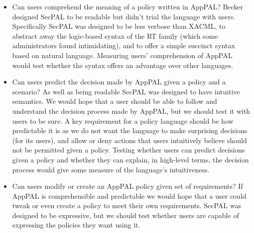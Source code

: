 \documentclass[thesis.tex]{subfiles}
\begin{document}
\begin{itemize}
\item Can users comprehend the meaning of a policy written in AppPAL? Becker
  designed SecPAL to be readable but didn't trial the language with users.
  Specifically SecPAL was designed to be less verbose than XACML, to abstract away
  the logic-based syntax of the RT family (which some administrators found
  intimidating), and to offer a simple succinct syntax based on natural language.
  Measuring users' comprehension of AppPAL would test whether the syntax offers an
  advantage over other languages.

\item Can users predict the decision made by AppPAL given a policy and
a scenario? As well as being readable SecPAL was designed to have
intuitive semantics. We would hope that a user should be able to
follow and understand the decision process made by AppPAL, but we
should test it with users to be sure. A key requirement for a policy
language should be how predictable it is as we do not want the language
to make surprising decisions (for its users), and allow or deny
actions that users intuitively believe should not be permitted given a
policy. Testing whether users can predict decisions given a policy and
whether they can explain, in high-level terms, the decision process
would give some measure of the language's intuitiveness.
  
\item Can users modify or create an AppPAL policy given set of requirements? If
  AppPAL is comprehensible and predictable we would hope that a user could tweak
  or even create a policy to meet their own requirements. SecPAL was designed to
  be expressive, but we should test whether users are capable of expressing the
  policies they want using it.
\end{itemize}
\end{document}
